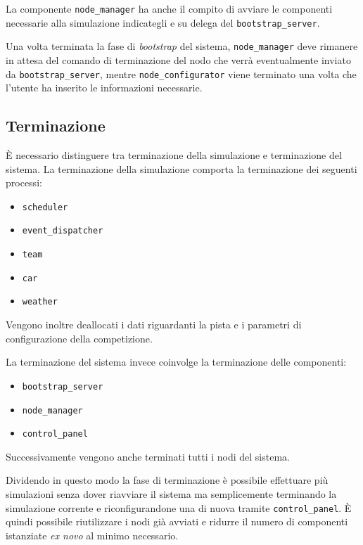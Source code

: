 La componente \texttt{node\_manager} ha anche il compito di avviare le componenti necessarie alla simulazione indicategli e su delega del \texttt{bootstrap\_server}.

Una volta terminata la fase di \textit{bootstrap} del sistema, \texttt{node\_manager} deve rimanere in attesa del comando di terminazione del nodo che verrà eventualmente inviato da \texttt{bootstrap\_server}, mentre \texttt{node\_configurator} viene terminato una volta che l'utente ha inserito le informazioni necessarie.

\subsection*{Terminazione}
\`E necessario distinguere tra terminazione della simulazione e terminazione del sistema.
La terminazione della simulazione comporta la terminazione dei seguenti processi:
\begin{itemize}
\item \texttt{scheduler}
\item \texttt{event\_dispatcher}
\item \texttt{team}
\item \texttt{car}
\item \texttt{weather}
\end{itemize}
Vengono inoltre deallocati i dati riguardanti la pista e i parametri di configurazione della competizione.

La terminazione del sistema invece coinvolge la terminazione delle componenti:
\begin{itemize}
\item \texttt{bootstrap\_server}
\item \texttt{node\_manager}
\item \texttt{control\_panel}
\end{itemize}
Successivamente vengono anche terminati tutti i nodi del sistema.

Dividendo in questo modo la fase di terminazione è possibile effettuare più simulazioni senza dover riavviare il sistema ma semplicemente terminando la simulazione corrente e riconfigurandone una di nuova tramite \texttt{control\_panel}. \`E quindi possibile riutilizzare i nodi già avviati e ridurre il numero di componenti istanziate \textit{ex novo} al minimo necessario.
 
